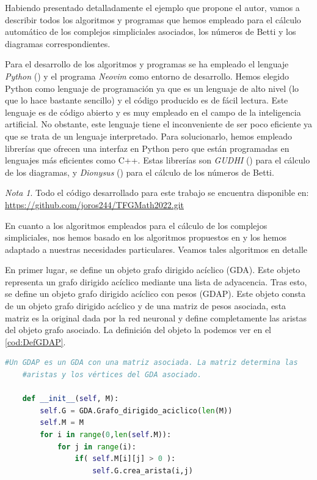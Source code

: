 \documentclass[12pt, a4paper, twoside]{book}
\numberwithin{equation}{section}
\theoremstyle{definition}
\theoremstyle{remark}
\newtheorem*{remark}{Nota}
\theoremstyle{plain}
\begin{document}
	Habiendo presentado detalladamente el ejemplo que propone el autor, 
	vamos a describir todos los algoritmos y programas que hemos empleado
	para el cálculo automático de los complejos simpliciales asociados, 
	los números de Betti y los diagramas correspondientes.

	Para el desarrollo de los algoritmos y programas se ha empleado el 
	lenguaje \emph{Python} (\cite{10.5555/1593511}) y el programa 
	\emph{Neovim} como entorno de desarrollo. Hemos elegido Python como 
	lenguaje de programación ya que es un lenguaje de alto nivel (lo que 
	lo hace bastante sencillo) y el código producido es de fácil lectura. 
	Este lenguaje es de código abierto y es muy empleado en el campo de la 
	inteligencia artificial. No obstante, este lenguaje tiene el 
	inconveniente de ser poco eficiente ya que se trata de un lenguaje 
	interpretado. Para solucionarlo, hemos empleado librerías que ofrecen 
	una interfaz en Python pero que están programadas en lenguajes más 
	eficientes como C++. Estas librerías son \emph{GUDHI} 
	(\cite{gudhi:urm}) para el cálculo de los diagramas, y \emph{Dionysus} 
	(\cite{morozov_2021}) para el cálculo de los números de Betti.

	\begin{remark}
	Todo el código desarrollado para este trabajo se encuentra disponible 
	en: \url{https://github.com/joros244/TFGMath2022.git}
	\end{remark}

	En cuanto a los algoritmos empleados para el cálculo de los complejos
	simpliciales, nos hemos basado en los algoritmos propuestos en 
	\cite{Algoritmos-Sedgewick} y los hemos adaptado a nuestras 
	necesidades particulares. Veamos tales algoritmos en detalle

	En primer lugar, se define un objeto grafo dirigido acíclico (GDA). 
	Este objeto representa un grafo dirigido acíclico mediante una lista 
	de adyacencia. Tras esto, se define un objeto grafo dirigido acíclico 
	con pesos (GDAP). Este objeto consta de un objeto grafo dirigido 
	acíclico y de una matriz de pesos asociada, esta matriz es la original 
	dada por la red neuronal y define completamente las aristas del objeto 
	grafo asociado. La definición del objeto la podemos ver en 
	el \autoref{cod:DefGDAP}.

	\begin{lstlisting}[language=Python, float=htbp, label=cod:DefGDAP, caption= 
	Definición del objeto GDAP.]
	#Un GDAP es un GDA con una matriz asociada. La matriz determina las 
	#aristas y los vértices del GDA asociado.
    	
	def __init__(self, M):
        self.G = GDA.Grafo_dirigido_aciclico(len(M))
        self.M = M
        for i in range(0,len(self.M)):
            for j in range(i):
                if( self.M[i][j] > 0 ):
                    self.G.crea_arista(i,j)
		    
	\end{lstlisting}
\end{document}
